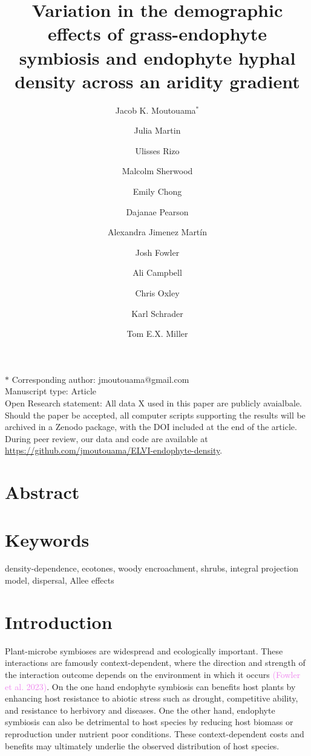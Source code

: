 \documentclass[11pt]{article}
\title{Variation in the demographic effects of grass-endophyte symbiosis and endophyte hyphal density across an aridity gradient}
\author[1]{Jacob K. Moutouama$^{\ast}$}
\author[1]{Julia Martin}
\author[1]{Ulisses Rizo}
\author[1]{Malcolm Sherwood}
\author[1]{Emily Chong}
\author[1]{Dajanae Pearson}
\author[1]{Alexandra Jimenez Martín}
\author[2]{Josh Fowler}
\author[1]{Ali Campbell}
\author[1]{Chris Oxley}
\author[1]{Karl Schrader}
\author[1]{Tom E.X. Miller}
\affil[1]{Program in Ecology and Evolutionary Biology, Department of BioSciences, Rice University, Houston, TX USA}
\affil[2]{University of Miami, Department of Biology, Miami, Florida}
\begin{document}
\maketitle
\noindent{} $\ast$ Corresponding author: jmoutouama@gmail.com\\
\noindent{} Manuscript type: Article\\
\noindent{} Open Research statement: All data X used in this paper are  publicly avaialbale. Should the paper be accepted, all computer scripts supporting the results will be archived in a Zenodo package, with the DOI included at the end of the article. During peer review, our data and code are available at \url{https://github.com/jmoutouama/ELVI-endophyte-density}. 


\linenumbers

\newpage
\section*{Abstract}

\section*{Keywords}

density-dependence, ecotones, woody encroachment, shrubs, integral projection model, dispersal, Allee effects

\newpage
\section*{Introduction}
Plant-microbe symbioses are widespread and ecologically important. 
These interactions are famously context-dependent, where the direction and strength of the interaction outcome depends on the environment in which it occurs \textcolor{violet} {(Fowler et al. 2023)}.
On the one hand endophyte symbiosis can benefits host plants by enhancing host resistance to abiotic stress such as drought, competitive ability, and resistance to herbivory and diseases.
One the other hand, endophyte symbiosis can also be detrimental to host species by reducing host biomass or reproduction under nutrient poor conditions. 
These context-dependent costs and benefits may ultimately underlie the observed distribution of host species. 
\end{document}
